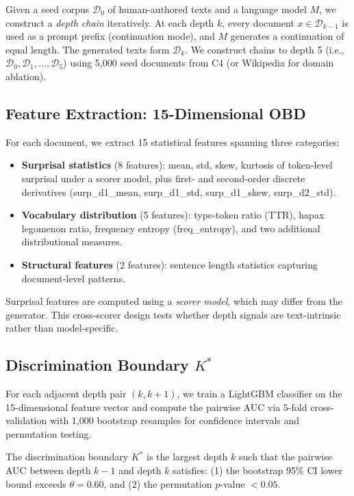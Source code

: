 \documentclass[11pt]{article}
\newcommand{\kstar}{K^{*}}
\newcommand{\thetaval}{\theta}
\begin{document}
Given a seed corpus $\mathcal{D}_0$ of human-authored texts and a language model $M$, we construct a \emph{depth chain} iteratively. At each depth $k$, every document $x \in \mathcal{D}_{k-1}$ is used as a prompt prefix (continuation mode), and $M$ generates a continuation of equal length. The generated texts form $\mathcal{D}_k$. We construct chains to depth 5 (i.e., $\mathcal{D}_0, \mathcal{D}_1, \ldots, \mathcal{D}_5$) using 5,000 seed documents from C4 (or Wikipedia for domain ablation).

\subsection{Feature Extraction: 15-Dimensional OBD}

For each document, we extract 15 statistical features spanning three categories:

\begin{itemize}
  \item \textbf{Surprisal statistics} (8 features): mean, std, skew, kurtosis of token-level surprisal under a scorer model, plus first- and second-order discrete derivatives (surp\_d1\_mean, surp\_d1\_std, surp\_d1\_skew, surp\_d2\_std).
  \item \textbf{Vocabulary distribution} (5 features): type-token ratio (TTR), hapax legomenon ratio, frequency entropy (freq\_entropy), and two additional distributional measures.
  \item \textbf{Structural features} (2 features): sentence length statistics capturing document-level patterns.
\end{itemize}

Surprisal features are computed using a \emph{scorer model}, which may differ from the generator. This cross-scorer design tests whether depth signals are text-intrinsic rather than model-specific.

\subsection{Discrimination Boundary $\kstar$}

For each adjacent depth pair $(k, k{+}1)$, we train a LightGBM classifier on the 15-dimensional feature vector and compute the pairwise AUC via 5-fold cross-validation with 1,000 bootstrap resamples for confidence intervals and permutation testing.

\begin{definition}[$\kstar$]
The discrimination boundary $\kstar$ is the largest depth $k$ such that the pairwise AUC between depth $k{-}1$ and depth $k$ satisfies: (1) the bootstrap 95\% CI lower bound exceeds $\thetaval = 0.60$, and (2) the permutation $p$-value $< 0.05$.
\end{definition}
\end{document}
